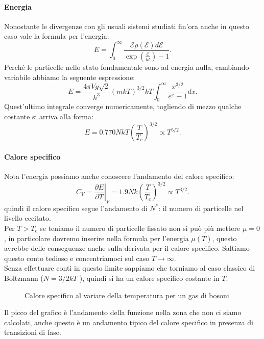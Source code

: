 \paragraph{Energia}
Nonostante le divergenze con gli usuali sistemi studiati fin'ora anche in questo caso vale la formula per l'energia:
\[
	E = \int_{0}^{\infty} 
	\frac{\mathcal{E} \rho ( \mathcal{E} ) d\mathcal{E} }
	{\exp\left( \frac{\mathcal{E} }{kt} \right) -1} 
.\] 
Perché le particelle nello stato fondamentale sono ad energia nulla, cambiando variabile abbiamo la seguente espressione:
\[
	E = \frac{4\pi V g \sqrt{2} }
	{h^3}\left( m k T \right) ^{3 /2} kT 
	\int_{0}^{\infty} \frac{x^{3 /2}}{e^{x}-1}dx  
.\] 
Quest'ultimo integrale converge numericamente, togliendo di mezzo qualche costante si arriva alla forma:
\[
	E = 0.770 NkT \left( \frac{T}{T_{c}} \right) ^{3 /2} \propto T^{5 /2}
.\] 
\paragraph{Calore specifico}
Nota l'energia possiamo anche conoscere l'andamento del calore specifico:
\[
	C_{V}= \left.\frac{\partial E}{\partial T} \right|_{V} = 1.9 Nk \left( \frac{T}{T_{c}} \right) ^{3 /2} \propto T^{3 /2}
.\] 
quindi il calore specifico segue l'andamento di $N^{*}$: il numero di particelle nel livello eccitato. \\
Per $T > T_{c}$ se teniamo il numero di particelle fissato non si può più mettere $\mu = 0$, in particolare dovremo inserire nella formula per l'energia $\mu(T)$, questo avrebbe delle conseguenze anche sulla derivata per il calore specifico. Saltiamo questo conto tedioso e concentriamoci sul caso $T\to \infty$.\\
Senza effettuare conti in questo limite sappiamo che torniamo al caso classico di Boltzmann ($N= 3/2 kT$ ), quindi si ha un calore specifico costante in $T$.
\begin{figure}[H]
    \centering
    \caption{Calore specifico al variare della temperatura per un gas di bosoni}
    \label{fig:calore-specifico-al-variare-della-temperatura-per-un-gas-di-bosoni}
\end{figure}
\noindent
Il picco del grafico è l'andamento della funzione nella zona che non ci siamo calcolati, anche questo è un andamento tipico del calore specifico in presenza di transizioni di fase.\\
